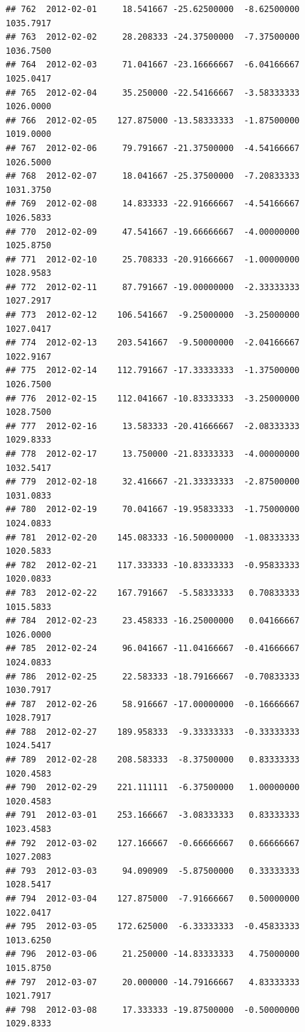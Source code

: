 \documentclass[
]{article}
\begin{document}
\begin{verbatim}
## 762  2012-02-01     18.541667 -25.62500000  -8.62500000    1035.7917
## 763  2012-02-02     28.208333 -24.37500000  -7.37500000    1036.7500
## 764  2012-02-03     71.041667 -23.16666667  -6.04166667    1025.0417
## 765  2012-02-04     35.250000 -22.54166667  -3.58333333    1026.0000
## 766  2012-02-05    127.875000 -13.58333333  -1.87500000    1019.0000
## 767  2012-02-06     79.791667 -21.37500000  -4.54166667    1026.5000
## 768  2012-02-07     18.041667 -25.37500000  -7.20833333    1031.3750
## 769  2012-02-08     14.833333 -22.91666667  -4.54166667    1026.5833
## 770  2012-02-09     47.541667 -19.66666667  -4.00000000    1025.8750
## 771  2012-02-10     25.708333 -20.91666667  -1.00000000    1028.9583
## 772  2012-02-11     87.791667 -19.00000000  -2.33333333    1027.2917
## 773  2012-02-12    106.541667  -9.25000000  -3.25000000    1027.0417
## 774  2012-02-13    203.541667  -9.50000000  -2.04166667    1022.9167
## 775  2012-02-14    112.791667 -17.33333333  -1.37500000    1026.7500
## 776  2012-02-15    112.041667 -10.83333333  -3.25000000    1028.7500
## 777  2012-02-16     13.583333 -20.41666667  -2.08333333    1029.8333
## 778  2012-02-17     13.750000 -21.83333333  -4.00000000    1032.5417
## 779  2012-02-18     32.416667 -21.33333333  -2.87500000    1031.0833
## 780  2012-02-19     70.041667 -19.95833333  -1.75000000    1024.0833
## 781  2012-02-20    145.083333 -16.50000000  -1.08333333    1020.5833
## 782  2012-02-21    117.333333 -10.83333333  -0.95833333    1020.0833
## 783  2012-02-22    167.791667  -5.58333333   0.70833333    1015.5833
## 784  2012-02-23     23.458333 -16.25000000   0.04166667    1026.0000
## 785  2012-02-24     96.041667 -11.04166667  -0.41666667    1024.0833
## 786  2012-02-25     22.583333 -18.79166667  -0.70833333    1030.7917
## 787  2012-02-26     58.916667 -17.00000000  -0.16666667    1028.7917
## 788  2012-02-27    189.958333  -9.33333333  -0.33333333    1024.5417
## 789  2012-02-28    208.583333  -8.37500000   0.83333333    1020.4583
## 790  2012-02-29    221.111111  -6.37500000   1.00000000    1020.4583
## 791  2012-03-01    253.166667  -3.08333333   0.83333333    1023.4583
## 792  2012-03-02    127.166667  -0.66666667   0.66666667    1027.2083
## 793  2012-03-03     94.090909  -5.87500000   0.33333333    1028.5417
## 794  2012-03-04    127.875000  -7.91666667   0.50000000    1022.0417
## 795  2012-03-05    172.625000  -6.33333333  -0.45833333    1013.6250
## 796  2012-03-06     21.250000 -14.83333333   4.75000000    1015.8750
## 797  2012-03-07     20.000000 -14.79166667   4.83333333    1021.7917
## 798  2012-03-08     17.333333 -19.87500000  -0.50000000    1029.8333

\end{verbatim}
\end{document}
